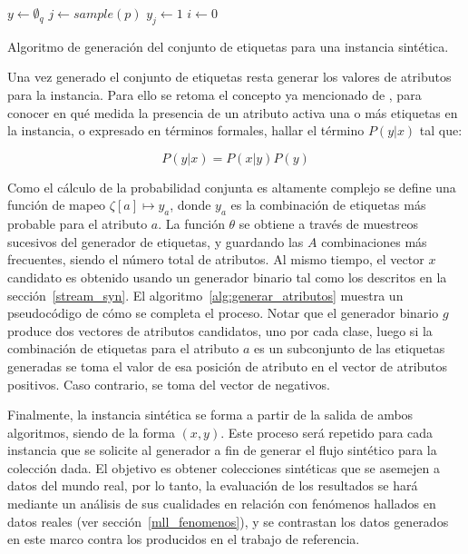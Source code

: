 \begin{center}
	\begin{algorithm}[H]
		\label{alg:generar_etiquetas}
		\SetAlgoLined
		\DontPrintSemicolon
		$y \gets \emptyset_{q}$\;
		$j \gets sample(p)$\;
		$y_{j} \gets 1$\;
		$i \gets 0$ \;
		\caption{Algoritmo de generación del conjunto de etiquetas para una instancia
			sintética.}
	\end{algorithm}
\end{center}

Una vez generado el conjunto de etiquetas resta generar los valores de atributos
para la instancia. Para ello se retoma el concepto ya mencionado de
, para conocer en qué medida la presencia de
un atributo activa una o más etiquetas en la instancia, o expresado en términos
formales, hallar el término $P(y|x)$ tal que:

\begin{equation}
	P(y|x) = P(x|y)P(y)
\end{equation}

Como el cálculo de la probabilidad conjunta es altamente complejo se define una
función de mapeo $\zeta[a] \mapsto y_{a}$, donde $y_{a}$ es la combinación de
etiquetas más probable para el atributo $a$.  La función $\theta$ se obtiene a
través de muestreos sucesivos del generador de etiquetas, y guardando las $A$
combinaciones más frecuentes, siendo el número total de atributos. Al mismo
tiempo, el vector $x$ candidato es obtenido usando un generador binario tal como
los descritos en la sección~\ref{stream_syn}. El
algoritmo~\ref{alg:generar_atributos} muestra un pseudocódigo de cómo se
completa el proceso. Notar que el generador binario $g$ produce dos vectores de
atributos candidatos, uno por cada clase, luego si la combinación de etiquetas
para el atributo $a$ es un subconjunto de las etiquetas generadas se toma el
valor de esa posición de atributo en el vector de atributos positivos. Caso
contrario, se toma del vector de negativos.

Finalmente, la instancia sintética se forma a partir de la salida de ambos
algoritmos, siendo de la forma $(x, y)$. Este proceso será repetido para cada
instancia que se solicite al generador a fin de generar el flujo sintético para
la colección dada. El objetivo es obtener colecciones sintéticas que se asemejen
a datos del mundo real, por lo tanto, la evaluación de los resultados se hará
mediante un análisis de sus cualidades en relación con fenómenos hallados en
datos reales (ver sección~\ref{mll_fenomenos}), y se contrastan los datos
generados en este marco contra los producidos en el trabajo de referencia.


